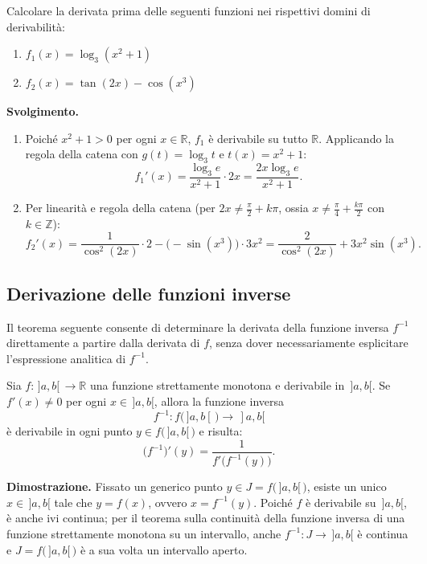 \begin{esbox}
Calcolare la derivata prima delle seguenti funzioni nei rispettivi domini di derivabilità:
\begin{enumerate}
    \item $f_1(x) = \log_3(x^2 + 1)$
    \item $f_2(x) = \tan(2x) - \cos(x^3)$
\end{enumerate}

\medskip
\noindent\textbf{Svolgimento.}
\begin{enumerate}
    \item Poiché $x^2 + 1 > 0$ per ogni $x \in \mathbb{R}$, $f_1$ è derivabile su tutto $\mathbb{R}$. Applicando la regola della catena con $g(t) = \log_3 t$ e $t(x) = x^2 + 1$:
    \[
        f_1'(x) = \frac{\log_3 e}{x^2 + 1} \cdot 2x = \frac{2x \log_3 e}{x^2 + 1}.
    \]
    \item Per linearità e regola della catena (per $2x \neq \frac{\pi}{2} + k\pi$, ossia $x \neq \frac{\pi}{4} + \frac{k\pi}{2}$ con $k \in \mathbb{Z}$):
    \[
        f_2'(x) = \frac{1}{\cos^2(2x)} \cdot 2 - \bigl(-\sin(x^3)\bigr) \cdot 3x^2 = \frac{2}{\cos^2(2x)} + 3x^2\sin(x^3).
    \]
\end{enumerate}
\end{esbox}

\subsection{Derivazione delle funzioni inverse}

Il teorema seguente consente di determinare la derivata della funzione inversa $f^{-1}$ direttamente a partire dalla derivata di $f$, senza dover necessariamente esplicitare l'espressione analitica di $f^{-1}$.

\begin{propbox}
Sia $f \colon \,]a,b[\, \to \mathbb{R}$ una funzione strettamente monotona e derivabile in $\,]a,b[$. Se $f'(x) \neq 0$ per ogni $x \in \,]a,b[$, allora la funzione inversa
\[
    f^{-1} \colon f\bigl(\,]a,b[\,\bigr) \to \,]a,b[
\]
è derivabile in ogni punto $y \in f\bigl(\,]a,b[\,\bigr)$ e risulta:
\[
    \bigl(f^{-1}\bigr)'(y) = \frac{1}{f'\bigl(f^{-1}(y)\bigr)}.
\]
\end{propbox}

\noindent\textbf{Dimostrazione.} Fissato un generico punto $y \in J = f\bigl(\,]a,b[\,\bigr)$, esiste un unico $x \in \,]a,b[$ tale che $y = f(x)$, ovvero $x = f^{-1}(y)$. Poiché $f$ è derivabile su $\,]a,b[$, è anche ivi continua; per il teorema sulla continuità della funzione inversa di una funzione strettamente monotona su un intervallo, anche $f^{-1} \colon J \to \,]a,b[$ è continua e $J = f\bigl(\,]a,b[\,\bigr)$ è a sua volta un intervallo aperto.

